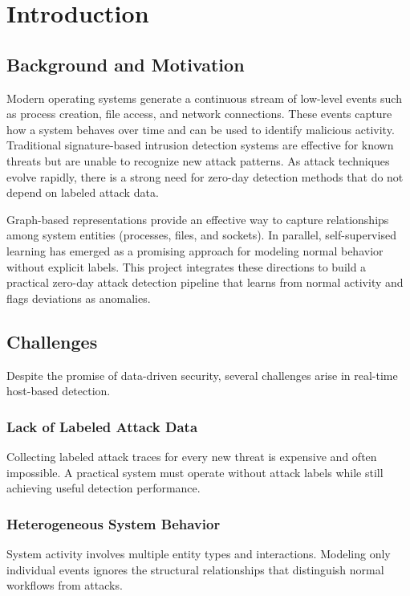 \chapter{Introduction}
\label{ch:introduction}

\section{Background and Motivation}
Modern operating systems generate a continuous stream of low-level events such as
process creation, file access, and network connections. These events capture how a
system behaves over time and can be used to identify malicious activity. Traditional
signature-based intrusion detection systems are effective for known threats but are
unable to recognize new attack patterns. As attack techniques evolve rapidly, there
is a strong need for zero-day detection methods that do not depend on labeled attack
data.

Graph-based representations provide an effective way to capture relationships among
system entities (processes, files, and sockets). In parallel, self-supervised learning
has emerged as a promising approach for modeling normal behavior without explicit
labels. This project integrates these directions to build a practical zero-day attack
detection pipeline that learns from normal activity and flags deviations as anomalies.

\section{Challenges}
Despite the promise of data-driven security, several challenges arise in real-time
host-based detection.

\subsection{Lack of Labeled Attack Data}
Collecting labeled attack traces for every new threat is expensive and often
impossible. A practical system must operate without attack labels while still
achieving useful detection performance.

\subsection{Heterogeneous System Behavior}
System activity involves multiple entity types and interactions. Modeling only
individual events ignores the structural relationships that distinguish normal
workflows from attacks.

